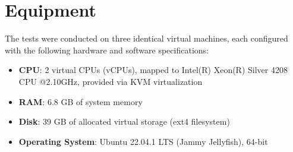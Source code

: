 \section{Equipment}
The tests were conducted on three identical virtual machines, each configured with the following hardware and software specifications:
\begin{itemize}
	\item \textbf{CPU}: 2 virtual CPUs (vCPUs), mapped to Intel(R) Xeon(R) Silver 4208 CPU @2.10GHz, provided via KVM virtualization
	\item \textbf{RAM}: 6.8 GB of system memory
	\item \textbf{Disk}: 39 GB of allocated virtual storage (ext4 filesystem)
	\item \textbf{Operating System}: Ubuntu 22.04.1 LTS (Jammy Jellyfish), 64-bit
\end{itemize}